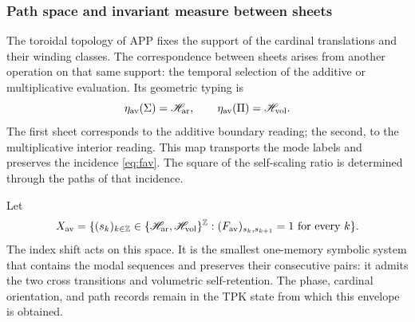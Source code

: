 \subsubsection{Path space and invariant measure between sheets}
\label{sec:medida-retorno-hojas}

The toroidal topology of APP fixes the support of the cardinal translations
and their winding classes. The correspondence between sheets arises from
another operation on that same support: the temporal selection of the
additive or multiplicative evaluation. Its geometric typing is
\[
 \eta_{\rm av}(\Sigma)=\mathscr H_{\rm ar},\qquad
 \eta_{\rm av}(\Pi)=\mathscr H_{\rm vol}.
\]
The first sheet corresponds to the additive boundary reading; the second,
to the multiplicative interior reading. This map transports the mode labels
and preserves the incidence \eqref{eq:fav}. The square of the self-scaling
ratio is determined through the paths of that incidence.

\begin{definition}
Let
\[
 X_{\rm av}=\{(s_k)_{k\in\mathbb Z}\in
 \{\mathscr H_{\rm ar},\mathscr H_{\rm vol}\}^{\mathbb Z}:
 (F_{\rm av})_{s_k,s_{k+1}}=1\text{ for every }k\}.
\]
The index shift acts on this space. It is the smallest one-memory symbolic
system that contains the modal sequences and preserves their consecutive
pairs: it admits the two cross transitions and volumetric self-retention.
The phase, cardinal orientation, and path records remain in the TPK state
from which this envelope is obtained.
\end{definition}


